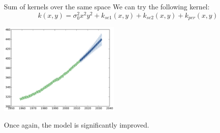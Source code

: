 \begin{frame}{Sum of kernels over the same space }
We can try the following kernel:
\begin{equation*}
k(x,y) = \sigma_0^2  x^2 y^2 + k_{se1}(x,y) + k_{se2}(x,y) + k_{per}(x,y)
\end{equation*}
\pause
\begin{center}
\vspace{-8mm}  \includegraphics[height=4.5cm]{3_gaussian_process_regression/figures/python/CO2-rbfabpq}
\end{center}
\begin{block}{}
\centering
\alert{Once again, the model is significantly improved.}
\end{block}
\end{frame}



